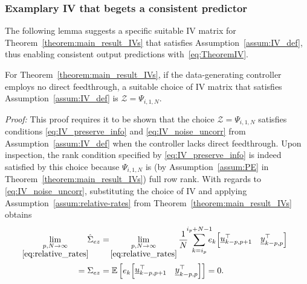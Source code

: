 \subsubsection{Examplary \acs{IV} that begets a consistent predictor}\label{sec:example_IV}
\noindent The following lemma suggests a specific suitable \acs{IV} matrix for Theorem~\ref{theorem:main_result_IVs} that satisfies Assumption~\ref{assum:IV_def}, thus enabling consistent output predictions with~\eqref{eq:TheoremIV}.
\setcounter{thm}{1}
\begin{lem}\label{lem:example_IV}
For Theorem~\ref{theorem:main_result_IVs}, if the data-generating controller employs no direct feedthrough, a suitable choice of \acs{IV} matrix that satisfies Assumption~\ref{assum:IV_def} is $\mathcal{Z}=\Psi_{i,1,N}$.%
\end{lem}
\textit{Proof:} This proof requires it to be shown that the choice ${\mathcal{Z}=\Psi_{i,1,N}}$ satisfies conditions \eqref{eq:IV_preserve_info} and \eqref{eq:IV_noise_uncorr} from Assumption~\ref{assum:IV_def} when the controller lacks direct feedthrough. Upon inspection, the rank condition specified by \eqref{eq:IV_preserve_info} is indeed satisfied by this choice because $\Psi_{i,1,N}$ is (by Assumption~\ref{assum:PE} in Theorem~\ref{theorem:main_result_IVs}) full row rank. With regards to \eqref{eq:IV_noise_uncorr}, substituting the choice of \acs{IV} and applying Assumption~\ref{assum:relative-rates} from Theorem~\ref{theorem:main_result_IVs} obtains%
\begin{align}\label{eq:E_Phi_correlation}
    \!\!\!\!\begin{split}
        \lim_{\underset{\eqref{eq:relative_rates}}{p,N\rightarrow\infty}}\!\!\hat{\Sigma}_{ez} &= \!\lim_{\underset{\eqref{eq:relative_rates}}{p,N\rightarrow\infty}}\frac{1}{N}\;\sum\limits_{k=i_p}^{\mathclap{i_p+N-1}} e_k\!\begin{bmatrix}\datavec{u}{k-p,p+1}^\top & \datavec{y}{k-p,p}^\top \end{bmatrix}\\
        =\Sigma_{ez} &=\mathbb{E}\left[e_k\!\begin{bmatrix}\datavec{u}{k-p,p+1}^\top & \datavec{y}{k-p,p}^\top \end{bmatrix}\right]=0.
    \end{split}
\end{align}
